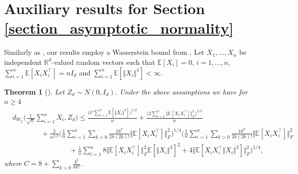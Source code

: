 \documentclass{article}
\newtheorem{Theorem}{Theorem}[section]
\begin{document}
\section{Auxiliary results for Section \ref{section_asymptotic_normality}}
Similarly as \cite{anastasiou2021wasserstein}, our results employ 
 a Wasserstein bound  from \cite{bonis2020stein}.  Let $X_1,\ldots,X_n$ be independent $\mathbb{R}^d$-valued random vectors such that $\mathbb{E}[X_i]=0$, $i=1,\ldots,n$, $\sum_{i=1}^n \mathbb{E}[X_i X_i^{\top}] = nI_d $ and $\sum_{i=1}^n \mathbb{E}[ \Vert X_i \Vert^4] < \infty $. 
\begin{Theorem}[{\cite[Theorem 5 with $m=2$]{bonis2020stein}}] \label{quant_clt_bonis}
Let ${Z}_{d} \sim N(0, I_d).$ Under the above assumptions  we have for  $n \geq 4$
\begin{align*}
     &d_{W_2}\bigg(\frac{1}{\sqrt{n}} \sum_{i=1}^n X_i, {Z}_{d}  \bigg) \leq  \frac{ \big(C \sum_{i=1}^n \mathbb{E}[\Vert X_i \Vert^4] \big)^{1/2}}{n} + \frac{\big( 2 \sum_{i=1}^n \Vert \mathbb{E}[X_i X_i^{\top}] \Vert_F^2 \big)^{1/2}}{n} \\
     & \qquad \qquad + \frac{2}{n^{1/2}} \bigg( \frac{1}{n} \sum_{i=1}^n \sum_{k> 0} \frac{16^k}{2k(2k)!} \Vert \mathbb{E}[X_i X_i^{\top}] \Vert_F^2  \bigg)^{1/4}  \bigg(\frac{1}{n} \sum_{i=1}^n \sum_{k> 0} \frac{16^k}{2k(2k)!} \Vert \mathbb{E}[X_i X_i^{\top}] \Vert_F^2  \\
     & \qquad \qquad \qquad \qquad + \frac{1}{n} \sum_{i=1}^n 8 \Vert \mathbb{E}[X_iX_i^{\top}] \Vert_F^2 \mathbb{E} [ \Vert X_i \Vert^2 ]^2 + 4 \Vert \mathbb{E}[X_i X_i^{\top} \Vert X_i \Vert^2]\Vert_F^2 \bigg)^{1/4},
\end{align*}
where $C=8+\sum_{k>0} \frac{4^k}{kk!}$.
\end{Theorem}
\end{document}
